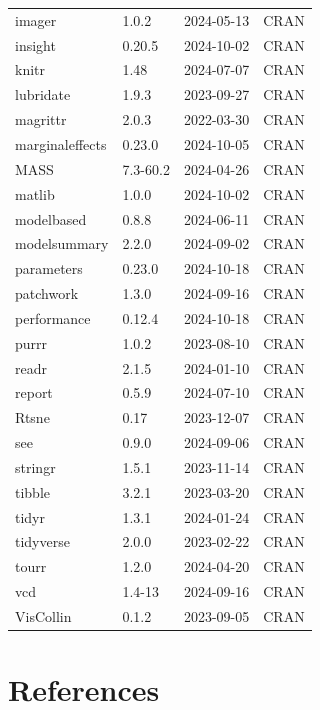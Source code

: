 \documentclass[
  letterpaper,
  10pt,
  krantz2]{krantz}
\begin{document}
\begin{longtable}[]{@{}llll@{}}
imager & 1.0.2 & 2024-05-13 & CRAN \\
insight & 0.20.5 & 2024-10-02 & CRAN \\
knitr & 1.48 & 2024-07-07 & CRAN \\
lubridate & 1.9.3 & 2023-09-27 & CRAN \\
magrittr & 2.0.3 & 2022-03-30 & CRAN \\
marginaleffects & 0.23.0 & 2024-10-05 & CRAN \\
MASS & 7.3-60.2 & 2024-04-26 & CRAN \\
matlib & 1.0.0 & 2024-10-02 & CRAN \\
modelbased & 0.8.8 & 2024-06-11 & CRAN \\
modelsummary & 2.2.0 & 2024-09-02 & CRAN \\
parameters & 0.23.0 & 2024-10-18 & CRAN \\
patchwork & 1.3.0 & 2024-09-16 & CRAN \\
performance & 0.12.4 & 2024-10-18 & CRAN \\
purrr & 1.0.2 & 2023-08-10 & CRAN \\
readr & 2.1.5 & 2024-01-10 & CRAN \\
report & 0.5.9 & 2024-07-10 & CRAN \\
Rtsne & 0.17 & 2023-12-07 & CRAN \\
see & 0.9.0 & 2024-09-06 & CRAN \\
stringr & 1.5.1 & 2023-11-14 & CRAN \\
tibble & 3.2.1 & 2023-03-20 & CRAN \\
tidyr & 1.3.1 & 2024-01-24 & CRAN \\
tidyverse & 2.0.0 & 2023-02-22 & CRAN \\
tourr & 1.2.0 & 2024-04-20 & CRAN \\
vcd & 1.4-13 & 2024-09-16 & CRAN \\
VisCollin & 0.1.2 & 2023-09-05 & CRAN \\
\end{longtable}

\chapter*{References}\label{references}

\end{document}
